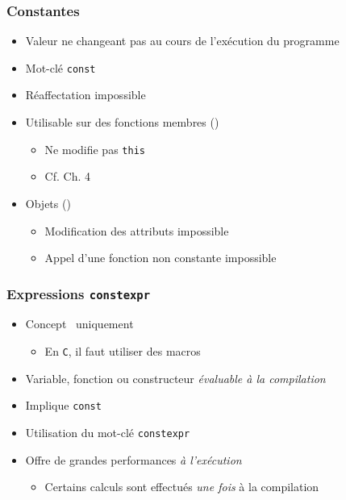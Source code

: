 \begin{frame}
\frametitle{Constantes}
\begin{itemize}[<+->]
\item Valeur ne changeant pas au cours de l'exécution du programme
\item Mot-clé \lstinline|const|
\item Réaffectation impossible
\item Utilisable sur des fonctions membres (\cpp)
	\begin{itemize}
	\item Ne modifie pas \lstinline|this|
	\item Cf. Ch. 4
	\end{itemize}
\item Objets (\cpp)
	\begin{itemize}
	\item Modification des attributs impossible
	\item Appel d'une fonction non constante impossible
	\end{itemize}
\end{itemize}
\end{frame}

\begin{frame}
\frametitle{Expressions \texttt{constexpr}}
\begin{itemize}[<+->]
\item Concept \cpp\ uniquement
	\begin{itemize}
	\item En \texttt{C}, il faut utiliser des macros
	\end{itemize}
\item Variable, fonction ou constructeur \emph{évaluable à la compilation}
\item Implique \lstinline|const| %
\item Utilisation du mot-clé \lstinline|constexpr|
\item Offre de grandes performances \emph{à l'exécution}
	\begin{itemize}
	\item Certains calculs sont effectués \emph{une fois} à la compilation
	\end{itemize}
\end{itemize}
\end{frame}

